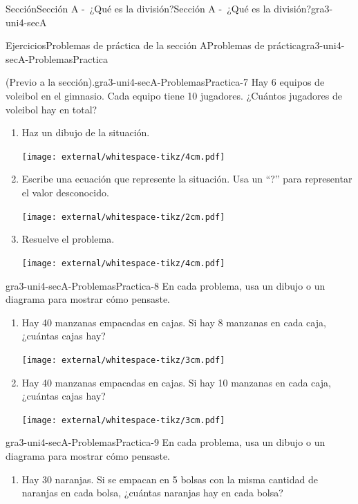 \begin{sectionptx}{Sección}{Sección A -~¿Qué es la división?}{}{Sección A -~¿Qué es la división?}{}{}{gra3-uni4-secA}
\begin{exercises-subsection}{Ejercicios}{Problemas de práctica de la sección A}{}{Problemas de práctica}{}{}{gra3-uni4-secA-ProblemasPractica}
\begin{divisionexercise}{5}{(Previo a la sección).}{}{gra3-uni4-secA-ProblemasPractica-7}
Hay 6 equipos de voleibol en el gimnasio. Cada equipo tiene 10 jugadores. ¿Cuántos jugadores de voleibol hay en total?%
\par
%
\begin{enumerate}[label={(\alph*)}]
\item{}Haz un dibujo de la situación.%
\begin{image}{0}{1}{0}{}%
\texttt{[image: external/whitespace-tikz/4cm.pdf]}
\end{image}%
\item{}Escribe una ecuación que represente la situación. Usa un “?” para representar el valor desconocido.%
\begin{image}{0}{1}{0}{}%
\texttt{[image: external/whitespace-tikz/2cm.pdf]}
\end{image}%
\item{}Resuelve el problema.%
\begin{image}{0}{1}{0}{}%
\texttt{[image: external/whitespace-tikz/4cm.pdf]}
\end{image}%
\end{enumerate}
%
\end{divisionexercise}%
\clearpage
\begin{divisionexercise}{6}{}{}{gra3-uni4-secA-ProblemasPractica-8}%
En cada problema, usa un dibujo o un diagrama para mostrar cómo pensaste.%
\par
%
\begin{enumerate}[label={(\alph*)}]
\item{}Hay 40 manzanas empacadas en cajas. Si hay 8 manzanas en cada caja, ¿cuántas cajas hay?%
\begin{image}{0}{1}{0}{}%
\texttt{[image: external/whitespace-tikz/3cm.pdf]}
\end{image}%
\item{}Hay 40 manzanas empacadas en cajas. Si hay 10 manzanas en cada caja, ¿cuántas cajas hay?%
\begin{image}{0}{1}{0}{}%
\texttt{[image: external/whitespace-tikz/3cm.pdf]}
\end{image}%
\end{enumerate}
%
\end{divisionexercise}%
\begin{divisionexercise}{7}{}{}{gra3-uni4-secA-ProblemasPractica-9}%
En cada problema, usa un dibujo o un diagrama para mostrar cómo pensaste.%
%
\begin{enumerate}[label={(\alph*)}]
\item{}Hay 30 naranjas. Si se empacan en 5 bolsas con la misma cantidad de naranjas en cada bolsa, ¿cuántas naranjas hay en cada bolsa?%

\end{enumerate}
\end{divisionexercise}
\end{exercises-subsection}
\end{sectionptx}
